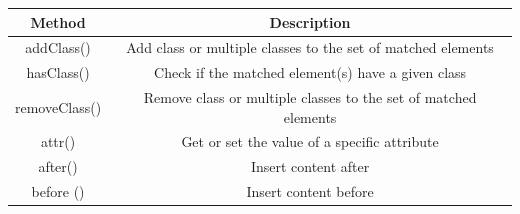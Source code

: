 \documentclass[
]{book}
\begin{document}
\begin{longtable}[]{@{}cc@{}}
\toprule
\begin{minipage}[b]{0.42\columnwidth}\centering
Method\strut
\end{minipage} & \begin{minipage}[b]{0.52\columnwidth}\centering
Description\strut
\end{minipage}\tabularnewline
\midrule
\endhead
\begin{minipage}[t]{0.42\columnwidth}\centering
addClass()\strut
\end{minipage} & \begin{minipage}[t]{0.52\columnwidth}\centering
Add class or multiple classes to the set of matched elements\strut
\end{minipage}\tabularnewline
\begin{minipage}[t]{0.42\columnwidth}\centering
hasClass()\strut
\end{minipage} & \begin{minipage}[t]{0.52\columnwidth}\centering
Check if the matched element(s) have a given class\strut
\end{minipage}\tabularnewline
\begin{minipage}[t]{0.42\columnwidth}\centering
removeClass()\strut
\end{minipage} & \begin{minipage}[t]{0.52\columnwidth}\centering
Remove class or multiple classes to the set of matched elements\strut
\end{minipage}\tabularnewline
\begin{minipage}[t]{0.42\columnwidth}\centering
attr()\strut
\end{minipage} & \begin{minipage}[t]{0.52\columnwidth}\centering
Get or set the value of a specific attribute\strut
\end{minipage}\tabularnewline
\begin{minipage}[t]{0.42\columnwidth}\centering
after()\strut
\end{minipage} & \begin{minipage}[t]{0.52\columnwidth}\centering
Insert content after\strut
\end{minipage}\tabularnewline
\begin{minipage}[t]{0.42\columnwidth}\centering
before ()\strut
\end{minipage} & \begin{minipage}[t]{0.52\columnwidth}\centering
Insert content before\strut
\end{minipage}\tabularnewline

\end{longtable}
\end{document}
